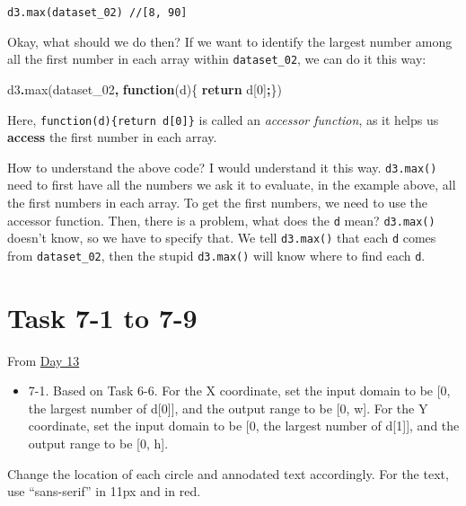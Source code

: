 \documentclass[
]{book}
\newenvironment{Shaded}{\begin{snugshade}}{\end{snugshade}}
\newcommand{\ControlFlowTok}[1]{\textcolor[rgb]{0.13,0.29,0.53}{\textbf{#1}}}
\newcommand{\DecValTok}[1]{\textcolor[rgb]{0.00,0.00,0.81}{#1}}
\newcommand{\FunctionTok}[1]{\textcolor[rgb]{0.00,0.00,0.00}{#1}}
\newcommand{\KeywordTok}[1]{\textcolor[rgb]{0.13,0.29,0.53}{\textbf{#1}}}
\newcommand{\NormalTok}[1]{#1}
\newcommand{\OperatorTok}[1]{\textcolor[rgb]{0.81,0.36,0.00}{\textbf{#1}}}
\providecommand{\tightlist}{%
  \setlength{\itemsep}{0pt}\setlength{\parskip}{0pt}}
\begin{document}
\texttt{d3.max(dataset\_02)\ //{[}8,\ 90{]}}

Okay, what should we do then? If we want to identify the largest number among all the first number in each array within \texttt{dataset\_02}, we can do it this way:

\begin{Shaded}
\begin{Highlighting}[]
\NormalTok{d3}\OperatorTok{.}\FunctionTok{max}\NormalTok{(dataset\_02}\OperatorTok{,} \KeywordTok{function}\NormalTok{(d)\{}
  \ControlFlowTok{return}\NormalTok{ d[}\DecValTok{0}\NormalTok{]}\OperatorTok{;}\NormalTok{\})}
\end{Highlighting}
\end{Shaded}

Here, \texttt{function(d)\{return\ d{[}0{]}\}} is called an \emph{accessor function}, as it helps us \textbf{access} the first number in each array.

How to understand the above code? I would understand it this way. \texttt{d3.max()} need to first have all the numbers we ask it to evaluate, in the example above, all the first numbers in each array. To get the first numbers, we need to use the accessor function. Then, there is a problem, what does the \texttt{d} mean? \texttt{d3.max()} doesn't know, so we have to specify that. We tell \texttt{d3.max()} that each \texttt{d} comes from \texttt{dataset\_02}, then the stupid \texttt{d3.max()} will know where to find each \texttt{d}.

\hypertarget{task-7-1-to-7-9}{%
\section{Task 7-1 to 7-9}\label{task-7-1-to-7-9}}

From \href{https://observablehq.com/@hongtaoh/day-thirteen-2020-09-06}{Day 13}

\begin{itemize}
\tightlist
\item
  7-1. Based on Task 6-6. For the X coordinate, set the input domain to be {[}0, the largest number of d{[}0{]}{]}, and the output range to be {[}0, w{]}. For the Y coordinate, set the input domain to be {[}0, the largest number of d{[}1{]}{]}, and the output range to be {[}0, h{]}.
\end{itemize}

Change the location of each circle and annodated text accordingly. For the text, use ``sans-serif'' in 11px and in red.
\end{document}
